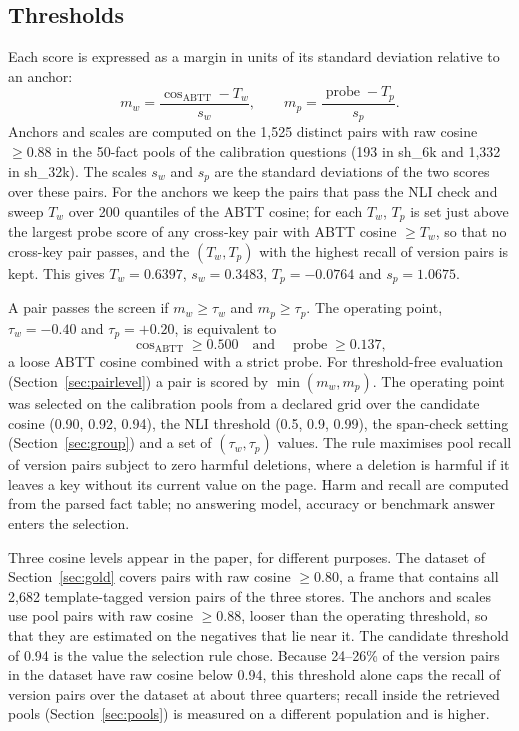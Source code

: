 \documentclass[11pt]{article}
\newcommand{\sub}[1]{\textsf{sh\_#1}}                    %
\begin{document}
\subsection{Thresholds}
\label{sec:margins}

Each score is expressed as a margin in units of its standard deviation relative to an anchor:
\begin{equation}
m_w=\frac{\cos_{\mathrm{ABTT}}-T_w}{s_w},\qquad m_p=\frac{\operatorname{probe}-T_p}{s_p}.
\end{equation}
Anchors and scales are computed on the 1,525 distinct pairs with raw cosine $\ge0.88$ in the 50-fact pools of the calibration questions (193 in \sub{6k} and 1,332 in \sub{32k}). The scales $s_w$ and $s_p$ are the standard deviations of the two scores over these pairs. For the anchors we keep the pairs that pass the NLI check and sweep $T_w$ over 200 quantiles of the ABTT cosine; for each $T_w$, $T_p$ is set just above the largest probe score of any cross-key pair with ABTT cosine $\ge T_w$, so that no cross-key pair passes, and the $(T_w,T_p)$ with the highest recall of version pairs is kept. This gives $T_w=0.6397$, $s_w=0.3483$, $T_p=-0.0764$ and $s_p=1.0675$.

A pair passes the screen if $m_w\ge\tau_w$ and $m_p\ge\tau_p$. The operating point, $\tau_w=-0.40$ and $\tau_p=+0.20$, is equivalent to
\begin{equation}
\cos_{\mathrm{ABTT}}\ge0.500\quad\text{and}\quad\operatorname{probe}\ge0.137,
\end{equation}
a loose ABTT cosine combined with a strict probe. For threshold-free evaluation (Section~\ref{sec:pairlevel}) a pair is scored by $\min(m_w,m_p)$. The operating point was selected on the calibration pools from a declared grid over the candidate cosine (0.90, 0.92, 0.94), the NLI threshold (0.5, 0.9, 0.99), the span-check setting (Section~\ref{sec:group}) and a set of $(\tau_w,\tau_p)$ values. The rule maximises pool recall of version pairs subject to zero harmful deletions, where a deletion is harmful if it leaves a key without its current value on the page. Harm and recall are computed from the parsed fact table; no answering model, accuracy or benchmark answer enters the selection.

Three cosine levels appear in the paper, for different purposes. The dataset of Section~\ref{sec:gold} covers pairs with raw cosine $\ge0.80$, a frame that contains all 2,682 template-tagged version pairs of the three stores. The anchors and scales use pool pairs with raw cosine $\ge0.88$, looser than the operating threshold, so that they are estimated on the negatives that lie near it. The candidate threshold of 0.94 is the value the selection rule chose. Because 24--26\% of the version pairs in the dataset have raw cosine below 0.94, this threshold alone caps the recall of version pairs over the dataset at about three quarters; recall inside the retrieved pools (Section~\ref{sec:pools}) is measured on a different population and is higher.
\end{document}
